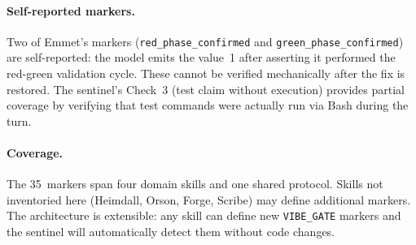 \paragraph{Self-reported markers.}
Two of Emmet's markers (\texttt{red\_phase\_confirmed} and
\texttt{green\_phase\_confirmed}) are self-reported: the model emits the
value~1 after asserting it performed the red-green validation cycle. These
cannot be verified mechanically after the fix is restored. The sentinel's
Check~3 (test claim without execution) provides partial coverage by verifying
that test commands were actually run via Bash during the turn.

\paragraph{Coverage.}
The 35~markers span four domain skills and one shared protocol. Skills not
inventoried here (Heimdall, Orson, Forge, Scribe) may define additional
markers. The architecture is extensible: any skill can define new
\texttt{VIBE\_GATE} markers and the sentinel will automatically detect them
without code changes.
